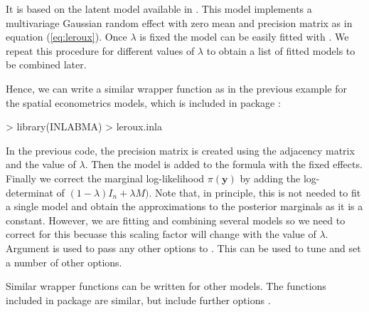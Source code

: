 \documentclass[article]{jss}
\begin{document}
It is based on the  latent model available in  .
This model implements a multivariage Gaussian random effect with zero mean and
precision matrix as in equation (\ref{eq:leroux}). Once $\lambda$ is fixed the
model can be easily fitted with .  We repeat this procedure for
different values of $\lambda$ to obtain a list of fitted models to be combined
later.

Hence, we can write a similar wrapper function as in the previous example for
the spatial econometrics models, which is included in package :

\begin{Schunk}
\begin{Sinput}
> library(INLABMA)
> leroux.inla
\end{Sinput}
\end{Schunk}


In the previous code, the precision matrix is created using the adjacency
matrix and the value of $\lambda$. Then the  model is added to the
formula with the fixed effects. Finally we correct the marginal log-likelihood
$\pi(\mathbf{y})$ by adding the log-determinat of $(1-\lambda)I_n+\lambda M)$.
Note that, in principle, this is not needed to fit a single model and obtain
the approximations to the posterior marginals as it is a constant. However, we
are fitting and combining several models so we need to correct for this
becuase this scaling factor will change with the value of $\lambda$.
Argument  is used to pass any other options to . 
This can be used to tune and set a number of other options.

Similar wrapper functions can be written for other models. The functions
included in package  are similar, but include further options
\citep[see,][for details]{Bivandetal:2013}.
\end{document}
